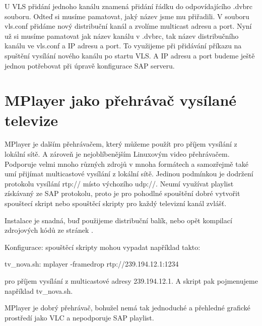 \vspace{10pt}

U VLS přidání jednoho kanálu znamená přidání řádku do odpovídajícího .dvbrc souboru. Odteď si musíme pamatovat, jaký název jsme mu přiřadili. V souboru vls.conf přidáme nový distribuční kanál a zvolíme multicast adresu a port. Nyní už si musíme pamatovat jak název kanálu v .dvbrc, tak název distribučního kanálu ve vls.conf a IP adresu a port. To využijeme při přidávání příkazu na spuštění vysílání nového kanálu po startu VLS. A IP adresu a port budeme ještě jednou potřebovat při úpravě konfigurace SAP serveru.

\vspace{10pt}

\section {MPlayer jako přehrávač vysílané televize}

MPlayer je dalším přehrávačem, který můžeme použít pro příjem vysílání z lokální sítě. A zároveň je nejoblíbenějším Linuxovým video přehrávačem. Podporuje velmi mnoho různých zdrojů v mnoha formátech a samozřejmě také umí přijímat multicastové vysílání z lokální sítě. Jedinou podmínkou je dodržení protokolu vysílání rtp:// místo výchozího udp://. Neumí využívat playlist získávaný ze SAP protokolu, proto je pro pohodlné spouštění dobré vytvořit spouštecí skript nebo spouštěcí skripty pro každý televizní kanál zvlášť.
\vspace{10pt}


\vspace{10pt}

Instalace je snadná, buď použijeme distribuční balík, nebo opět kompilací zdrojových kódů ze stránek \cite{mplayerURL}. 

\vspace{10pt}

Konfigurace: spouštěcí skripty mohou vypadat například takto:

tv\_nova.sh: mplayer -framedrop rtp://239.194.12.1:1234

pro příjem vysílání z multicastové adresy 239.194.12.1. A skript pak pojmenujeme například tv\_nova.sh.

\vspace{10pt}

MPlayer je dobrý přehrávač, bohužel nemá tak jednoduché a přehledné grafické prostředí jako VLC a nepodporuje SAP playlist.
